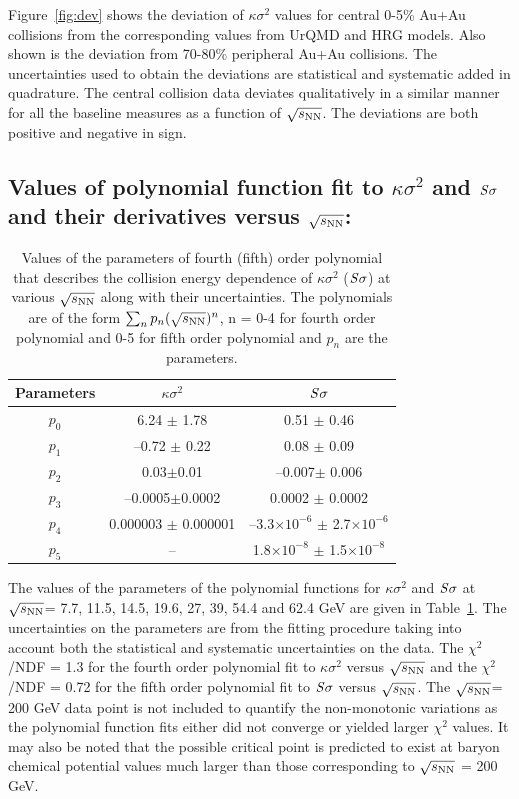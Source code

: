 \documentclass[10pt,aps,prc,twocolumn,floatfix]{revtex4-1}
\newcommand{\rootsnn} {\mbox{$\sqrt{s_{\rm NN}}$}\xspace}
\begin{document}
{Figure~\ref{fig:dev} shows the deviation of $\kappa\sigma^{2}$ values for central 0-5\% Au+Au
collisions from the corresponding values from UrQMD and HRG
models. Also shown is the deviation from 70-80\% peripheral Au+Au
collisions. The uncertainties used to obtain the deviations are
statistical and systematic added in quadrature. The central collision
data deviates qualitatively in a similar manner for all the baseline
measures as a function of \rootsnn. The deviations are both positive
and negative in sign.


\subsection{Values of polynomial function fit to  $\kappa\sigma^{2}$
  and $\it{S}\sigma$ and their derivatives versus \rootsnn:}

\begin{table}
  \caption{Values of the parameters of fourth (fifth) order polynomial 
  that describes the collision energy dependence of $\kappa\sigma^{2}$
  ($\it{S}\sigma$) at various \rootsnn along with their 
uncertainties. The polynomials are of the form $\sum_{n} p_{n}
({\sqrt{s_{\rm NN}}})^{n}$, n = 0-4 for fourth order polynomial and 0-5 
for fifth order polynomial and $p_{n}$ are the parameters.}
	\centering   
	\begin{tabular}{|c|c|c|}
			\hline	
		Parameters &  $\kappa\sigma^{2}$&$\it{S}\sigma$    \\
		\hline 
		$p_{0}$& 6.24 $\pm$ 1.78 &0.51 $\pm$ 0.46 \\
		\hline 
		$p_{1}$ & --0.72 $\pm$ 0.22 &0.08 $\pm$ 0.09 \\
		\hline 
		$p_{2}$ & 0.03$\pm$0.01  &--0.007$\pm$ 0.006 \\
		\hline 
		$p_{3}$ & --0.0005$\pm$0.0002 & 0.0002 $\pm$ 0.0002\\
		\hline 
		$p_{4}$ & 0.000003 $\pm$ 0.000001& --3.3$\times10^{-6}$ $\pm$ 2.7$\times10^{-6} $\\
		\hline 
		$p_{5}$ & -- & 1.8$\times10^{-8}$ $\pm$ 1.5$\times10^{-8} $\\
		\hline 
	\end{tabular}
	\label{tab1}
\end{table}

The values of the parameters of the polynomial functions for $\kappa\sigma^{2}$
and $\it{S}\sigma$ at \rootsnn = 7.7, 11.5, 14.5, 19.6, 27, 39, 54.4 and
62.4 GeV are given in Table~\ref{tab1}. The uncertainties on the
parameters are from the fitting procedure taking into account both the
statistical and systematic uncertainties on the data. The
$\chi^{2}$/NDF = 1.3 for the fourth order polynomial fit to
$\kappa\sigma^{2}$  versus \rootsnn and the $\chi^{2}$/NDF = 0.72 for
the fifth order polynomial fit to $\it{S}\sigma$ versus \rootsnn.
The \rootsnn =
200 GeV data point is not included to quantify the non-monotonic
variations as the polynomial function fits either did not converge or
yielded larger $\chi^{2}$ values. It may also be noted
that the possible critical point is predicted to exist at baryon
chemical potential values much larger than those corresponding to \rootsnn
= 200 GeV.


}
\end{document}
